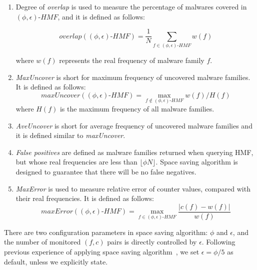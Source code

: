 \begin{enumerate}

\item 
Degree of \textit{overlap} is used to measure the percentage of malwares covered in $(\phi, \epsilon)\mbox{-}HMF$,
and it is defined as follows:

\begingroup\makeatletter{}\check@mathfonts
$$overlap((\phi, \epsilon)\mbox{-}HMF) = \dfrac{1}{N}\sum_{f \in (\phi, \epsilon)\mbox{-}HMF}w(f)$$
\endgroup

where $w(f)$ represents the real frequency of malware family $f$.  

\item 
\textit{MaxUncover} is short for maximum frequency of uncovered malware families. 
It is defined as follows:
\begingroup\makeatletter\def\f@size{8}\check@mathfonts
$$maxUncover((\phi, \epsilon)\mbox{-}HMF) = \max_{f \notin (\phi, \epsilon)\mbox{-}HMF}w(f)/H(f)$$
\endgroup
where $H(f)$ is the maximum frequency of all malware families. 

\item 
\textit{AveUncover} is short for average frequency of uncovered malware families 
and it is defined similar to \textit{maxUncover}. 

\item 
\textit{False positives} are defined as malware families returned when querying HMF, 
but whose real frequencies are less than $\lfloor \phi N \rfloor$. 
Space saving algorithm is designed to guarantee that there will be no false negatives. 

\item 
\textit{MaxError} is used to measure relative error of counter values, 
compared with their real frequencies.
It is defined as follows:
\begingroup\makeatletter\def\f@size{8}\check@mathfonts
$$maxError((\phi, \epsilon)\mbox{-}HMF) = \max_{f \in (\phi, \epsilon)\mbox{-}HMF} \dfrac{\left|c(f) - w(f)\right|}{w(f)}$$
\endgroup

\end{enumerate}

There are two configuration parameters in space saving algorithm: $\phi$ and $\epsilon$, 
and the number of monitored $(f, c)$ pairs is directly controlled by $\epsilon$. 
Following previous experience of applying space saving algorithm~\cite{hot-calling-context}, 
we set $\epsilon = \phi/5$ as default, 
unless we explicitly state.  

